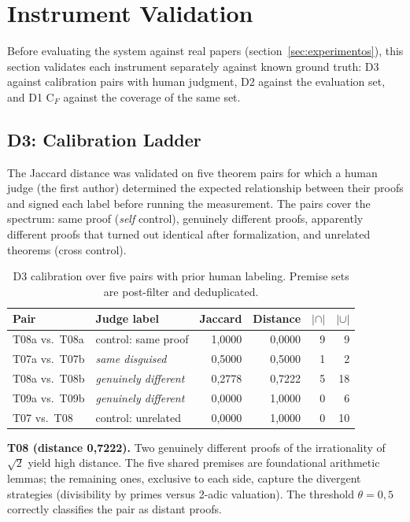\section{Instrument Validation}

\label{sec:instrumentos}

Before evaluating the system against real papers (section~\ref{sec:experimentos}), this section validates each instrument separately against known ground truth: D3 against calibration pairs with human judgment, D2 against the evaluation set, and D1 C$_F$ against the coverage of the same set.

\subsection{D3: Calibration Ladder}
\label{ssec:d3cal}

The Jaccard distance was validated on five theorem pairs for which a human judge (the first author) determined the expected relationship between their proofs and signed each label before running the measurement. The pairs cover the spectrum: same proof (\textit{self} control), genuinely different proofs, apparently different proofs that turned out identical after formalization, and unrelated theorems (cross control).

\begin{table}[htbp]
\centering
\small
\setlength{\tabcolsep}{5pt}
\begin{tabular}{llrrrr}
\toprule
Pair & Judge label & Jaccard & Distance & $|\cap|$ & $|\cup|$ \\
\midrule
T08a vs.\ T08a & control: same proof      & 1{,}0000 & 0{,}0000 & 9 & 9 \\
T07a vs.\ T07b & \textit{same disguised}    & 0{,}5000 & 0{,}5000 & 1 & 2 \\
T08a vs.\ T08b & \textit{genuinely different} & 0{,}2778 & 0{,}7222 & 5 & 18 \\
T09a vs.\ T09b & \textit{genuinely different} & 0{,}0000 & 1{,}0000 & 0 & 6 \\
T07 vs.\ T08   & control: unrelated   & 0{,}0000 & 1{,}0000 & 0 & 10 \\
\bottomrule
\end{tabular}
\caption{D3 calibration over five pairs with prior human labeling. Premise sets are post-filter and deduplicated.}
\label{tab:d3cal}
\end{table}

\textbf{T08 (distance 0{,}7222).} Two genuinely different proofs of the irrationality of $\sqrt{2}$ yield high distance. The five shared premises are foundational arithmetic lemmas; the remaining ones, exclusive to each side, capture the divergent strategies (divisibility by primes versus 2-adic valuation). The threshold $\theta = 0{,}5$ correctly classifies the pair as distant proofs.

